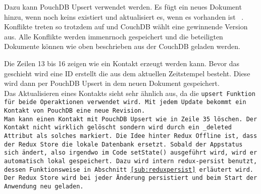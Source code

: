 Dazu kann PouchDB Upsert verwendet werden.
Es fügt ein neues Dokument hinzu, wenn noch keins existiert und aktualisiert es, wenn es vorhanden ist ~\cite{pouch_conflicts}. Konflikte treten so trotzdem auf und CouchDB wählt eine gewinnende Version aus.
Alle Konflikte werden immenrnoch gespeichert und die beteiligten Dokumente können wie oben beschrieben aus der CouchDB geladen werden.
%
\begin{center}
  
\end{center}
%
Die Zeilen 13 bis 16 zeigen wie ein Kontakt erzeugt werden kann. Bevor das geschieht wird eine ID erstellt die aus dem aktuellen Zeitstempel besteht. Diese wird dann per PouchDB Upsert in dem neuen Dokument gespeichert.\\
Das Aktualisieren eines Kontakts sieht sehr ähnlich aus, da die \tt{upsert} Funktion für beide Operaktionen verwendet wird.
Mit jedem Update bekommt ein Kontakt von PouchDB eine neue Revision.\\
Man kann einen Kontakt mit PouchDB Upsert wie in Zeile 35 löschen.
Der Kontakt nicht wirklich gelöscht sondern wird durch ein \tt{\_deleted} Attribut als solches markiert.
%
%
Die Idee hinter Redux Offline ist, dass der Redux Store die lokale Datenbank ersetzt. Sobald der Appstatus sich ändert, also irgendwo im Code \tt{setState()} ausgeführt wird, wird er automatisch lokal gespeichert. Dazu wird intern \tt{redux-persist} benutzt, dessen Funktionsweise in Abschnitt \ref{sub:reduxpersist} erläutert wird. Der Redux Store wird bei jeder Änderung persistiert und beim Start der Anwendung neu geladen.

